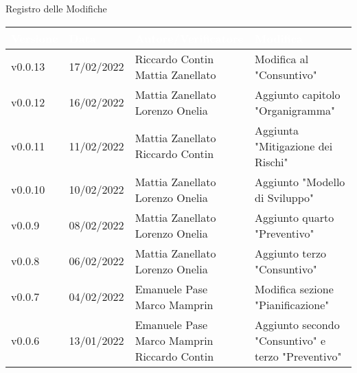 \begin{center}
  \huge{Registro delle Modifiche}
\end{center}
\newcommand{\aCapo}[1]{%
  \begin{tabular}{@{}c@{}}\strut#1\strut\end{tabular}%
}

\begin{center}
  \renewcommand\arraystretch{1.5}
  \centering
  \begin{longtable}{|p{2cm}|p{2cm}|p{4cm}|p{5cm}|}
    \hline
    \rowcolor[HTML]{036400}
    \textcolor[HTML]{FFFFFF}{\textbf{Versione}} & \textcolor[HTML]{FFFFFF}{\textbf{Data}} & \textcolor[HTML]{FFFFFF}{\textbf{Autore/Verificatore}} & \textcolor[HTML]{FFFFFF}{\textbf{Modifica}} \\ \hline
    \rowcolor[HTML]{EFEFEF}
    v0.0.13           & 17/02/2022    & \aCapo{Riccardo Contin\\Mattia Zanellato}             & Modifica al "Consuntivo" \\ \hline
    \rowcolor[HTML]{C0C0C0}
    v0.0.12           & 16/02/2022    & \aCapo{Mattia Zanellato\\Lorenzo Onelia}              & Aggiunto capitolo "Organigramma" \\ \hline
    \rowcolor[HTML]{EFEFEF}
    v0.0.11           & 11/02/2022    & \aCapo{Mattia Zanellato\\Riccardo Contin}             & Aggiunta "Mitigazione dei Rischi" \\ \hline
    \rowcolor[HTML]{C0C0C0}
    v0.0.10           & 10/02/2022    & \aCapo{Mattia Zanellato\\Lorenzo Onelia}              & Aggiunto "Modello di Sviluppo" \\ \hline
    \rowcolor[HTML]{EFEFEF}
    v0.0.9            & 08/02/2022    & \aCapo{Mattia Zanellato\\Lorenzo Onelia}              & Aggiunto quarto "Preventivo" \\ \hline
    \rowcolor[HTML]{C0C0C0}
    v0.0.8            & 06/02/2022    & \aCapo{Mattia Zanellato\\Lorenzo Onelia}              & Aggiunto terzo "Consuntivo" \\ \hline
    \rowcolor[HTML]{EFEFEF}
    v0.0.7            & 04/02/2022    & \aCapo{Emanuele Pase\\Marco Mamprin}                  & Modifica sezione "Pianificazione" \\ \hline
    \rowcolor[HTML]{C0C0C0}
    v0.0.6            & 13/01/2022    & \aCapo{Emanuele Pase\\Marco Mamprin\\Riccardo Contin} & Aggiunto secondo "Consuntivo" e terzo "Preventivo" \\ \hline

\end{longtable}
\end{center}
